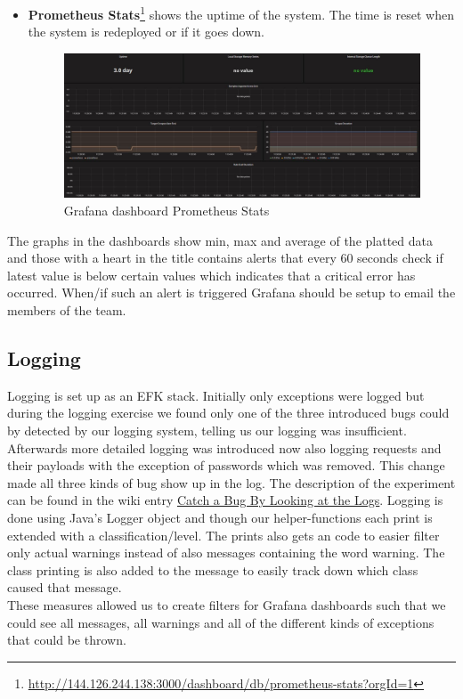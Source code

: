 \begin{itemize}
    \item \textbf{Prometheus Stats}\footnote{\url{http://144.126.244.138:3000/dashboard/db/prometheus-stats?orgId=1}} shows the uptime of the system. The time is reset when the system is redeployed or if it goes down.
    \begin{figure}[H]
        \centering
        \includegraphics[width=1.0\textwidth]{images/Grafana_prometheous_stats.JPG}
        \caption{Grafana dashboard Prometheus Stats}
        \label{fig:grafana_prometheus}
    \end{figure}
\end{itemize}
The graphs in the dashboards show min, max and average of the platted data and those with a heart in the title contains alerts that every 60 seconds check if latest value is below certain values which indicates that a critical error has occurred. When/if such an alert is triggered Grafana should be setup to email the members of the team.



\subsection{Logging}
Logging is set up as an EFK stack. Initially only exceptions were logged but during the logging exercise we found only one of the three introduced bugs could by detected by our logging system, telling us our logging was insufficient. Afterwards more detailed logging was introduced now also logging requests and their payloads with the exception of passwords which was removed. This change made all three kinds of bug show up in the log. The description of the experiment can be found in the wiki entry \underline{\href{https://github.com/DevOps2021-gb/devops2021/wiki/Catch-a-Bug-By-Looking-at-the-Logs}{Catch a Bug By Looking at the Logs}}. Logging is done using Java's Logger object and though our helper-functions each print is extended with a classification/level. The prints also gets an code to easier filter only actual warnings instead of also messages containing the word warning. The class printing is also added to the message to easily track down which class caused that message.\\
These measures allowed us to create filters for Grafana dashboards such that we could see all messages, all warnings and all of the different kinds of exceptions that could be thrown. 


